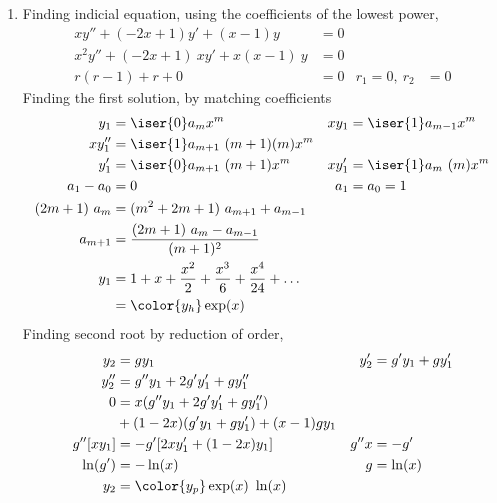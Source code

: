 \begin{enumerate}
    \item Finding indicial equation, using the coefficients of the lowest power,
          \begin{align}
              x y'' + (-2x+1)y' + (x-1)y         & = 0   \\
              x^2 y'' + (-2x+1)\ xy' + x(x-1)\ y & = 0   \\
              r(r - 1) + r + 0                   & = 0 &
              r_1 = 0,\ r_2                      & = 0
          \end{align}
          Finding the first solution, by matching coefficients
          \begin{align}
              y_1         & = \iser{0} a_m x^m                      &
              xy_1        & = \iser{1} a_{m-1} x^{m}                  \\
              xy_1''      & = \iser{1} a_{m+1}\ (m+1)(m)x^{m}         \\
              y_1'        & = \iser{0} a_{m+1}\ (m+1) x^{m}         &
              xy_1'       & = \iser{1} a_{m}\ (m) x^m                 \\
              a_1 - a_0   & = 0                                     &
              a_1         & = a_0 = 1                                 \\
              (2m+1)\ a_m & = (m^2+ 2m + 1)\ a_{m+1} + a_{m-1}        \\
              a_{m+1}     & = \frac{(2m+1)\ a_m - a_{m-1}}{(m+1)^2}   \\
              y_1         & = 1 + x + \frac{x^2}{2} + \frac{x^3}{6}
              + \frac{x^4}{24} + \dots                                \\
                          & = \color{y_h} \exp(x)
          \end{align}
          Finding second root by reduction of order,
          \begin{align}
              y_2       & = gy_1                              &
              y_2'      & = g'y_1 + gy_1'                       \\
              y_2''     & = g''y_1 + 2g'y_1' + gy_1''           \\
              0         & = x(g''y_1 + 2g'y_1' + gy_1'')        \\
                        & + (1-2x)(g'y_1 + gy_1') + (x-1)gy_1   \\
              g''[xy_1] & = -g' [2xy_1' + (1 - 2x)y_1]        &
              g''x      & = -g'                                 \\
              \ln(g')   & = -\ln(x)                           &
              g         & = \ln(x)                              \\
              y_2       & = \color{y_p} \exp(x)\ \ln(x)
          \end{align}


\end{enumerate}
